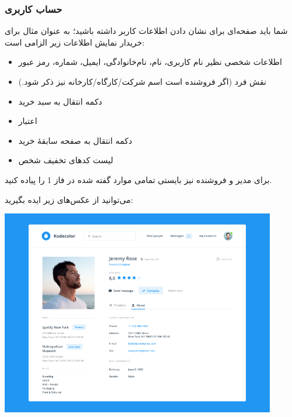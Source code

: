 \documentclass[]{article}
\begin{document}
\newpage


\subsubsection*{{\titr حساب کاربری}}

شما باید صفحه‌ای برای نشان دادن اطلاعات کاربر داشته باشید؛ به عنوان مثال برای خریدار نمایش اطلاعات زیر الزامی است:

\begin{itemize}
\item
اطلاعات شخصی نظیر نام کاربری، نام، نام‌خانوادگی، ایمیل، شماره، رمز عبور

\item
نقش فرد (اگر فروشنده است اسم شرکت/کارگاه/کارخانه نیز ذکر شود.)

\item
دکمه انتقال به سبد خرید

\item
اعتبار

\item
دکمه‌ انتقال به صفحه سابقهٔ خرید

\item
لیست کدهای تخفیف شخص




\end{itemize}


برای مدیر و فروشنده نیز بایستی تمامی موارد گفته شده در فاز 1 را پیاده کنید.


می‌توانید از عکس‌های زیر ایده بگیرید:


\begin{center}
\includegraphics[width=0.9\textwidth]{images/image13.png}
\end{center}
\end{document}
